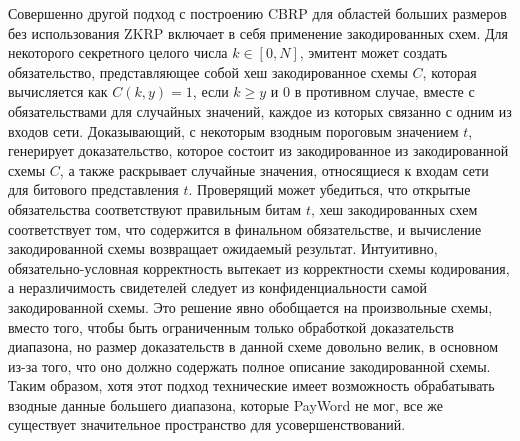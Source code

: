 Совершенно другой подход с построению CBRP для областей больших размеров без использования ZKRP включает в себя применение закодированных схем.
Для некоторого секретного целого числа $k \in [0, N]$, эмитент может создать обязательство, представляющее собой хеш закодированное схемы $C$, которая вычисляется как $C(k, y) = 1$, если $k \geq y$ и $0$ в противном случае, вместе с обязательствами для случайных значений, каждое из которых связанно с одним из входов сети.
Доказывающий, с некоторым взодным пороговым значением $t$, генерирует доказательство, которое состоит из закодированное из закодированной схемы $C$, а также раскрывает случайные значения, относящиеся к входам сети для битового представления $t$.
Проверящий может убедиться, что открытые обязательства соответствуют правильным битам $t$, хеш закодированных схем соответствует том, что содержится в финальном обязательстве, и вычисление закодированной схемы возвращает ожидаемый результат.
Интуитивно, обязательно-условная корректность вытекает из корректности схемы кодирования, а неразличимость свидетелей следует из конфиденциальности самой закодированной схемы.
Это решение явно обобщается на произвольные схемы, вместо того, чтобы быть ограниченным только обработкой доказательств диапазона, но размер доказательств в данной схеме довольно велик, в основном из-за того, что оно должно содержать полное описание закодированной схемы.
Таким образом, хотя этот подход технические имеет возможность обрабатывать взодные данные большего диапазона, которые PayWord не мог, все же существует значительное пространство для усовершенствований.


